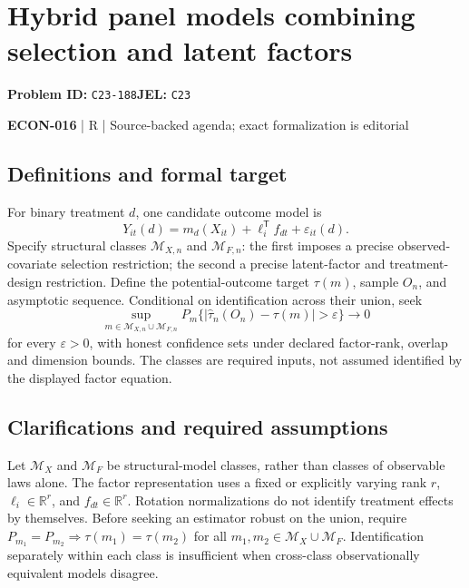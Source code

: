 \documentclass[11pt,a4paper]{article}
\begin{document}
\section*{Hybrid panel models combining selection and latent factors}
\textbf{Problem ID:} \texttt{C23-188}\quad \textbf{JEL:} \texttt{C23}\par
\label{problem:OP-0601}


\label{audited:ECON-016}

{\sffamily\small\color{muted}\textbf{ECON-016} | R | Source-backed agenda; exact formalization is editorial\par}

\subsection*{Definitions and formal target}

For binary treatment \(d\), one candidate outcome model is
\[
 Y_{it}(d)=m_d(X_{it})+\ell_i^{\mathsf T}f_{dt}+\varepsilon_{it}(d).
\]
Specify structural classes \(\mathcal M_{X,n}\) and \(\mathcal M_{F,n}\): the first imposes a precise observed-covariate selection restriction; the second a precise latent-factor and treatment-design restriction. Define the potential-outcome target \(\tau(m)\), sample \(O_n\), and asymptotic sequence. Conditional on identification across their union, seek
\[
 \sup_{m\in\mathcal M_{X,n}\cup\mathcal M_{F,n}}
 P_m\{|\widehat\tau_n(O_n)-\tau(m)|>\varepsilon\}\longrightarrow0
\]
for every \(\varepsilon>0\), with honest confidence sets under declared factor-rank, overlap and dimension bounds. The classes are required inputs, not assumed identified by the displayed factor equation.

\subsection*{Clarifications and required assumptions}

Let $\mathcal M_X$ and $\mathcal M_F$ be structural-model classes, rather than classes of observable laws alone. The factor representation uses a fixed or explicitly varying rank $r$, $\ell_i\in\mathbb R^r$, and $f_{dt}\in\mathbb R^r$. Rotation normalizations do not identify treatment effects by themselves. Before seeking an estimator robust on the union, require $P_{m_1}=P_{m_2}\Rightarrow\tau(m_1)=\tau(m_2)$ for all $m_1,m_2\in\mathcal M_X\cup\mathcal M_F$. Identification separately within each class is insufficient when cross-class observationally equivalent models disagree.
\end{document}
